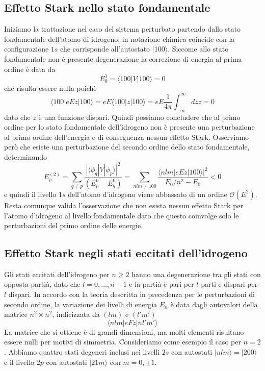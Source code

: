 \subsection{Effetto Stark nello stato fondamentale}

Iniziamo la trattazione nel caso del sistema perturbato partendo dallo stato fondamentale dell'atomo di idrogeno; in notazione chimica coincide con la configurazione $1s$ che corrisponde all'autostato $| 100\rangle $. Siccome allo stato fondamentale non \`e presente degenerazione la correzione di energia al prima ordine \`e data da 
\begin{equation*}
	E^1_{0} = \langle 100|V |100 \rangle = 0 
\end{equation*}
che risulta essere nulla poich\`e 
\begin{equation*}
	\langle 100| eEz | 100 \rangle = eE \langle 100|z|100 \rangle  = eE\frac{1}{4 \pi} \int_{-\infty}^{\infty}dz z = 0 
\end{equation*}
dato che $z$ \`e una funzione dispari. Quindi possiamo concludere che al primo ordine per lo stato fondamentale dell'idrogeno non \`e presente una perturbazione al primo ordine dell'energia e di conseguenza nessun effetto Stark.
Osserviamo per\`o che  esiste una perturbazione del secondo ordine dello stato fondamentale, determinando
\begin{equation*}
	E_p^{(2)} = \sum_{q \neq p} \frac{|\langle \phi_q|V|\phi_p \rangle |^2}{(E_p^0-E_q^0)} = \sum_{nlm \neq 100} \frac{\langle nlm | eEz|100 \rangle|^2}{E_0/n^2-E_0} < 0
\end{equation*}
e quindi il livello $1s$ dell'atomo d'idrogeno viene abbassato di un ordine $\mathcal{O}(E^2)$. Resta comunque valida l'osservazione che non esista nessun effetto Stark per l'atomo d'idrogeno al livello fondamentale dato che questo coinvolge solo le perturbazioni del primo ordine delle energie.
\subsection{Effetto Stark negli stati eccitati dell'idrogeno}

Gli stati eccitati dell'idrogeno per $n \geq 2$ hanno una degenerazione tra gli stati con opposta parti\`a, dato che $l = 0,...,n-1$ e la parti\`a \`e pari per $l$ parti e dispari per $l$ dispari.  In accordo con la teoria descritta in precedenza per le perturbazioni di secondo ordine, la variazione dei livelli di energia $E_n$ \`e data dagli autovalori della matrice $n^2 \times n^2$, indicizzata da $(lm)$ e $(l'm')$
\begin{equation*}
	\langle nlm| eFz|nl'm' \rangle 
\end{equation*}
La matrice che si ottiene \`e di grandi dimensioni, ma molti elementi risultano essere nulli per motivi di simmetria. Consideriamo come esempio il caso per $n = 2 $. Abbiamo quattro stati degeneri inclusi nei livelli $2s$ con autostati $|nlm \rangle = |200 \rangle $ e il livello $2p$ con autostati $|21m \rangle $ con $m = 0, \pm 1$. 

